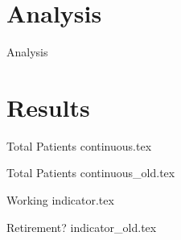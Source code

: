\documentclass[10pt]{beamer}
\begin{document}
\section{Analysis}

\begin{frame}{Analysis}


    
\end{frame}

\section{Results}

\begin{frame}[shrink=30]{Total Patients}
\centering
{continuous.tex}
\end{frame}

\begin{frame}[shrink=30]{Total Patients}
\centering
{continuous_old.tex}
\end{frame}

\begin{frame}[shrink=30]{Working}
\centering
{indicator.tex}
\end{frame}

\begin{frame}[shrink=30]{Retirement?}
\centering
{indicator_old.tex}
\end{frame}
\end{document}
